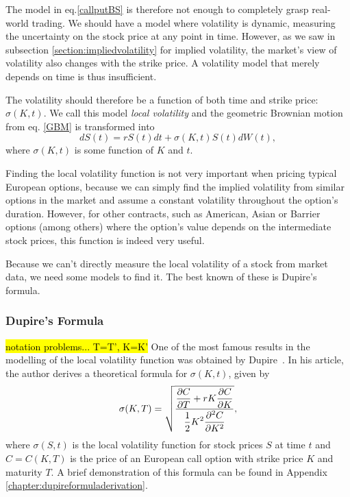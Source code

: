 The model in eq.\eqref{callputBS} is therefore not enough to completely grasp real-world trading. We should have a model where volatility is dynamic, measuring the uncertainty on the stock price at any point in time.
However, as we saw in subsection \ref{section:impliedvolatility} for implied volatility, the market's view of volatility also changes with the strike price. A volatility model that merely depends on time is thus insufficient.

The volatility should therefore be a function of both time and strike price: $\sigma(K,t)$. We call this model \emph{local volatility} and the geometric Brownian motion from eq. \ref{GBM} is transformed into
\begin{equation}\label{GBM2}
dS(t)=rS(t)dt+\sigma(K,t)S(t)dW(t),
\end{equation}
\noindent where $\sigma(K,t)$ is some function of $K$ and $t$.


Finding the local volatility function is not very important when pricing typical European options, because we can simply find the implied volatility from similar options in the market and assume a constant volatility throughout the option's duration.
However, for other contracts, such as American, Asian or Barrier options (among others) where the option's value depends on the intermediate stock prices, this function is indeed very useful.

Because we can't directly measure the local volatility of a stock from market data, we need some models to find it. The best known of these is Dupire's formula.

\subsubsection{Dupire's Formula}
\label{subsubsection:Dupire}
\hl{notation problems... T=T', K=K'}
One of the most famous results in the modelling of the local volatility function was obtained by Dupire~\cite{Dupire}. In his article, the author derives a theoretical formula for $\sigma(K,t)$, given by
\begin{equation}\label{dupire}
\sigma(K,T)=\sqrt{\frac{\displaystyle\pdv{C}{T}+rK\pdv{C}{K}}{\displaystyle\frac{1}{2}K^2\pdv{^2C}{K^2}}},
\end{equation}
\noindent where $\sigma(S,t)$ is the local volatility function for stock prices $S$ at time $t$ and $C=C(K,T)$ is the price of an European call option with strike price $K$ and maturity $T$.
A brief demonstration of this formula can be found in Appendix \ref{chapter:dupireformuladerivation}.



